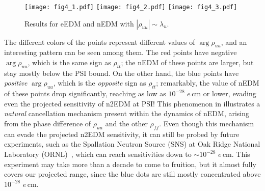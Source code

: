 \begin{figure}[t]
  \centering
  \texttt{[image: fig4\_1.pdf]}
  \texttt{[image: fig4\_2.pdf]}
  \texttt{[image: fig4\_3.pdf]}
  \caption{Results for eEDM and nEDM with \(|\rho_{uu}| \sim \lambda_{u}\).}
  \label{fig:nEDM-varied}
\end{figure}

The different colors of the points represent different values of \(\arg\rho_{uu} \), and an interesting pattern can be seen among them.
The red points have negative \(\arg\rho_{uu} \), which is the same sign as \(\rho_{tt} \); 
the nEDM of these points are larger, but stay mostly below the PSI bound.
On the other hand, the blue points have \textit{positive} \(\arg\rho_{uu} \), which is the \textit{opposite} sign as \(\rho_{tt} \); 
remarkably, the value of nEDM of these points drop significantly, reaching as low as \(10^{-28} \) \(e\,\mathrm{cm} \) or lower, 
evading even the projected sensitivity of n2EDM at PSI!
This phenomenon in  illustrates a \textit{natural} cancellation mechanism present within the dynamics of nEDM,
arising from the phase difference of \(\rho_{uu} \) and the other \(\rho_{ff} \).
Even though this mechanism can evade the projected n2EDM sensitivity, it can still be probed by future experiments, such as the Spallation Neutron Source (SNS) at Oak Ridge National Laboratory (ORNL)~\cite{SNS-ORNL}, which can reach sensitivities down to \(\sim 10^{-28} \) \(e\,\mathrm{cm} \).
This experiment may take more than a decade to come to fruition, but it almost fully covers our projected range, since the blue dots are still mostly concentrated above \(10^{-28} \) \(e\,\mathrm{cm} \).